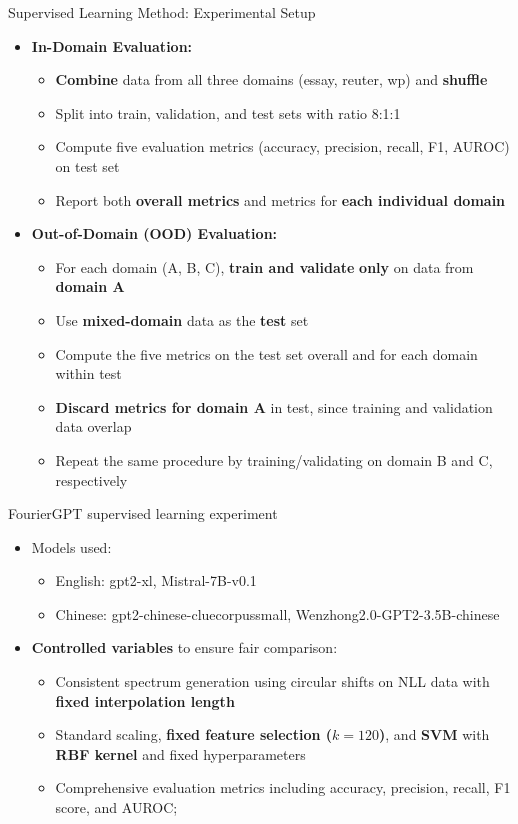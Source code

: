 \documentclass[serif]{beamer}
\begin{document}
\begin{frame}{Supervised Learning Method: Experimental Setup}
\begin{itemize}
  \item \textbf{In-Domain Evaluation:}
  \begin{itemize}
    \item \textbf{Combine} data from all three domains (essay, reuter, wp) and \textbf{shuffle}
    \item Split into train, validation, and test sets with ratio 8:1:1
    \item Compute five evaluation metrics (accuracy, precision, recall, F1, AUROC) on test set
    \item Report both \textbf{overall metrics} and metrics for \textbf{each individual domain}
  \end{itemize}
  \item \textbf{Out-of-Domain (OOD) Evaluation:}
  \begin{itemize}
    \item For each domain (A, B, C), \textbf{train and validate} \textbf{only} on data from \textbf{domain A}
    \item Use \textbf{mixed-domain} data as the \textbf{test} set
    \item Compute the five metrics on the test set overall and for each domain within test
    \item \textbf{Discard metrics for domain A} in test, since training and validation data overlap
    \item Repeat the same procedure by training/validating on domain B and C, respectively
  \end{itemize}
\end{itemize}
\end{frame}

\begin{frame}{FourierGPT supervised learning experiment}
\begin{itemize}
  \item Models used:
  \begin{itemize}
    \item English: gpt2-xl, Mistral-7B-v0.1
    \item Chinese: gpt2-chinese-cluecorpussmall, Wenzhong2.0-GPT2-3.5B-chinese
  \end{itemize}
\item \textbf{Controlled variables} to ensure fair comparison:
  \begin{itemize}
    \item Consistent spectrum generation using circular shifts on NLL data with\textbf{ fixed interpolation length}
    \item Standard scaling, \textbf{fixed feature selection ($k=120$)}, and \textbf{SVM} with \textbf{RBF kernel} and fixed hyperparameters
    \item Comprehensive evaluation metrics including accuracy, precision, recall, F1 score, and AUROC; 
  \end{itemize}
\end{itemize}
\end{frame}
\end{document}
